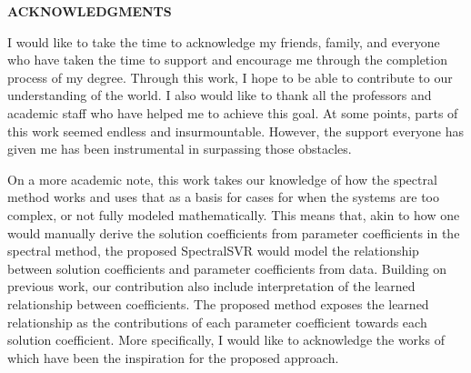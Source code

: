 \clearpage
{}
\begin{center}
 \textbf{\large ACKNOWLEDGMENTS}\\[3em]
\end{center}
\noindent I would like to take the time to acknowledge my friends, family, and everyone who have taken the time to support and encourage me through the completion process of my degree. Through this work, I hope to be able to contribute to our understanding of the world. I also would like to thank all the professors and academic staff who have helped me to achieve this goal. At some points, parts of this work seemed endless and insurmountable. However, the support everyone has given me has been instrumental in surpassing those obstacles.

On a more academic note, this work takes our knowledge of how the spectral method works and uses that as a basis for cases for when the systems are too complex, or not fully modeled mathematically. This means that, akin to how one would manually derive the solution coefficients from parameter coefficients in the spectral method, the proposed SpectralSVR would model the  relationship between solution coefficients and parameter coefficients from data. Building on previous work, our contribution also include interpretation of the learned relationship between coefficients. The proposed method exposes the learned relationship as the contributions of each parameter coefficient towards each solution coefficient. More specifically, I would like to acknowledge the works of \textcite{fanaskovSpectralNeuralOperators2023,du2024neural,ustunVisualisationInterpretationSupport2007} which have been the inspiration for the proposed approach.



